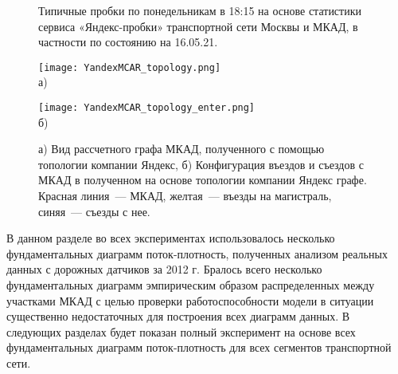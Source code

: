 \begin{figure}[ht]
    \caption{Типичные пробки по понедельникам в 18:15 на основе статистики сервиса «Яндекс-пробки» транспортной сети Москвы и МКАД, в частности по состоянию на 16.05.21.}
    \label{fig:MCAR_map}
\end{figure}

\begin{figure}[ht]
    \begin{minipage}[b][][b]{0.7045\textwidth}
        \centering
        \texttt{[image: YandexMCAR\_topology.png]} \\ а)
    \end{minipage}
    \hfill
    \begin{minipage}[b][][b]{0.2755\textwidth}
        \centering
        \texttt{[image: YandexMCAR\_topology\_enter.png]} \\ б)
    \end{minipage}

    \caption{а) Вид рассчетного графа МКАД, полученного с помощью топологии компании Яндекс, б) Конфигурация въездов и съездов с МКАД в полученном на основе топологии компании Яндекс графе. Красная линия~--- МКАД, желтая~--- въезды на магистраль, синяя~--- съезды с нее.}
    \label{fig:MCAR_topology}
\end{figure}

В данном разделе во всех экспериментах использовалось несколько фундаментальных диаграмм поток-плотность, полученных анализом реальных данных с дорожных датчиков за 2012 г.
Бралось всего несколько фундаментальных диаграмм эмпирическим образом распределенных между участками МКАД с целью проверки работоспособности модели в ситуации существенно недостаточных для построения всех диаграмм данных.
В следующих разделах будет показан полный эксперимент на основе всех фундаментальных диаграмм поток-плотность для всех сегментов транспортной сети.

